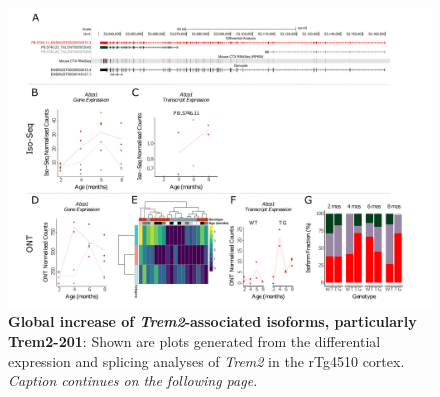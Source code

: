 \begin{landscape}
	\begin{figure}[htp]
		\begin{center}
			\includegraphics[page=18,trim={0 0.5cm 0 1.5cm},scale =0.85]{Figures/TargetGene_DifferentialAnalysis.pdf}
		\end{center}
		\captionsetup{width=1.5\textwidth}
		\caption[Differential \textit{Trem2} transcript expression from targeted profiling of rTg4510 mice]%
		{\textbf{Global increase of \textit{Trem2}-associated isoforms, particularly Trem2-201}: Shown are plots generated from the differential expression and splicing analyses of \textit{Trem2} in the rTg4510 cortex. \textit{Caption continues on the following page.}}   
		\label{fig:trem2_diff_analysis}
	\end{figure}
\end{landscape}
